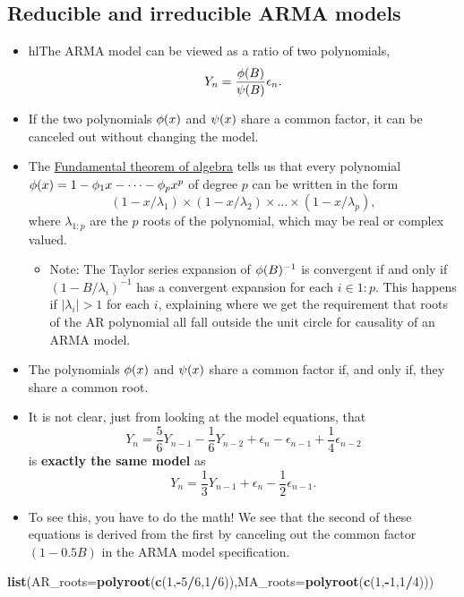\documentclass[]{article}
\newenvironment{Shaded}{\begin{snugshade}}{\end{snugshade}}
\newcommand{\KeywordTok}[1]{\textcolor[rgb]{0.13,0.29,0.53}{\textbf{#1}}}
\newcommand{\DataTypeTok}[1]{\textcolor[rgb]{0.13,0.29,0.53}{#1}}
\newcommand{\DecValTok}[1]{\textcolor[rgb]{0.00,0.00,0.81}{#1}}
\newcommand{\OperatorTok}[1]{\textcolor[rgb]{0.81,0.36,0.00}{\textbf{#1}}}
\newcommand{\NormalTok}[1]{#1}
\providecommand{\tightlist}{%
  \setlength{\itemsep}{0pt}\setlength{\parskip}{0pt}}
\begin{document}
\subsection{Reducible and irreducible ARMA
models}\label{reducible-and-irreducible-arma-models}

\begin{itemize}
\item
  hl{The ARMA model can be viewed as a ratio of two polynomials},
  \[ Y_n = \frac{\phi(B)}{\psi(B)} \epsilon_n.\]
\item
  If the two polynomials \(\phi(x)\) and \(\psi(x)\) share a common
  factor, it can be canceled out without changing the model.
\item
  The
  \href{https://en.wikipedia.org/wiki/Fundamental_theorem_of_algebra}{Fundamental
  theorem of algebra} tells us that every polynomial
  \(\phi(x) = 1-\phi_1 x - \dots - \phi_p x^p\) of degree \(p\) can be
  written in the form
  \[(1-x/\lambda_1) \times (1-x/\lambda_2) \times \dots \times (1-x/\lambda_p),\]
  where \(\lambda_{1:p}\) are the \(p\) roots of the polynomial, which
  may be real or complex valued.

  \begin{itemize}
  \tightlist
  \item
    Note: The Taylor series expansion of \(\phi(B)^{-1}\) is convergent
    if and only if \((1-B/\lambda_i)^{-1}\) has a convergent expansion
    for each \(i\in 1:p\). This happens if \(|\lambda_i|>1\) for each
    \(i\), explaining where we get the requirement that roots of the AR
    polynomial all fall outside the unit circle for causality of an ARMA
    model.
  \end{itemize}
\item
  The polynomials \(\phi(x)\) and \(\psi(x)\) share a common factor if,
  and only if, they share a common root.
\item
  It is not clear, just from looking at the model equations, that
  \[ Y_n = \frac{5}{6} Y_{n-1} -  \frac{1}{6} Y_{n-2} + \epsilon_n- \epsilon_{n-1}+\frac{1}{4} \epsilon_{n-2}\]
  is \textbf{exactly the same model} as
  \[ Y_n = \frac{1}{3} Y_{n-1} + \epsilon_n- \frac{1}{2}\epsilon_{n-1}.\]
\item
  To see this, you have to do the math! We see that the second of these
  equations is derived from the first by canceling out the common factor
  \((1-0.5B)\) in the ARMA model specification.
\end{itemize}

\begin{Shaded}
\begin{Highlighting}[]
\KeywordTok{list}\NormalTok{(}\DataTypeTok{AR_roots=}\KeywordTok{polyroot}\NormalTok{(}\KeywordTok{c}\NormalTok{(}\DecValTok{1}\NormalTok{,}\OperatorTok{-}\DecValTok{5}\OperatorTok{/}\DecValTok{6}\NormalTok{,}\DecValTok{1}\OperatorTok{/}\DecValTok{6}\NormalTok{)),}\DataTypeTok{MA_roots=}\KeywordTok{polyroot}\NormalTok{(}\KeywordTok{c}\NormalTok{(}\DecValTok{1}\NormalTok{,}\OperatorTok{-}\DecValTok{1}\NormalTok{,}\DecValTok{1}\OperatorTok{/}\DecValTok{4}\NormalTok{)))}
\end{Highlighting}
\end{Shaded}
\end{document}
